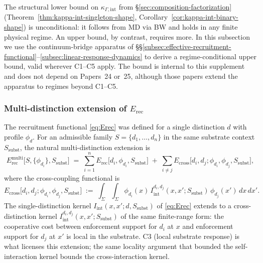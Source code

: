 \documentclass[11pt]{article}
\begin{document}
The structural lower bound on $\kappa_{\Gamma,\mathrm{int}}$ from \S\ref{sec:composition-factorization} (Theorem~\ref{thm:kappa-int-singleton-shape}, Corollary~\ref{cor:kappa-int-binary-shape}) is unconditional: it follows from MD via BW and holds in any finite physical regime.  An upper bound, by contrast, requires more.  In this subsection we use the continuum-bridge apparatus of \S\S\ref{subsec:effective-recruitment-functional}--\ref{subsec:linear-response-dynamics} to derive a regime-conditional upper bound, valid wherever C1--C5 apply.  The bound is internal to this supplement and does not depend on Papers~24 or~25, although those papers extend the apparatus to regimes beyond C1--C5.

\subsubsection*{Multi-distinction extension of \texorpdfstring{$E_{\mathrm{rec}}$}{Erec}}

The recruitment functional \eqref{eq:Erec} was defined for a single distinction $d$ with profile $\phi_d$.  For an admissible family $S = \{d_1, \ldots, d_n\}$ in the same substrate context $S_{\mathrm{subst}}$, the natural multi-distinction extension is
\begin{equation}\label{eq:Erec-multi}
E_{\mathrm{rec}}^{\mathrm{multi}}\bigl[S, \{\phi_{d_i}\}, S_{\mathrm{subst}}\bigr]
\;=\;
\sum_{i=1}^n E_{\mathrm{rec}}\bigl[d_i, \phi_{d_i}, S_{\mathrm{subst}}\bigr]
\;+\;
\sum_{i\neq j} E_{\mathrm{cross}}\bigl[d_i, d_j; \phi_{d_i}, \phi_{d_j}, S_{\mathrm{subst}}\bigr],
\end{equation}
where the cross-coupling functional is
\begin{equation}\label{eq:Ecross}
E_{\mathrm{cross}}\bigl[d_i, d_j; \phi_{d_i}, \phi_{d_j}, S_{\mathrm{subst}}\bigr]
\;:=\;
\int_\Sigma\!\!\int_\Sigma \phi_{d_i}(x)\,
I_{\mathrm{int}}^{d_i, d_j}(x, x'; S_{\mathrm{subst}})\,
\phi_{d_j}(x') \, dx \, dx'.
\end{equation}
The single-distinction kernel $I_{\mathrm{int}}(x, x'; d, S_{\mathrm{subst}})$ of \eqref{eq:Erec} extends to a cross-distinction kernel $I_{\mathrm{int}}^{d_i, d_j}(x, x'; S_{\mathrm{subst}})$ of the same finite-range form: the cooperative cost between enforcement support for $d_i$ at $x$ and enforcement support for $d_j$ at $x'$ is local in the substrate.  C3 (local substrate response) is what licenses this extension; the same locality argument that bounded the self-interaction kernel bounds the cross-interaction kernel.
\end{document}
